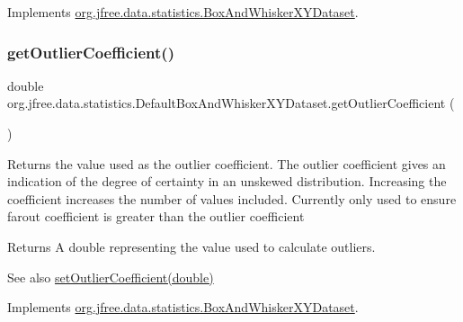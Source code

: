 Implements \mbox{\hyperlink{interfaceorg_1_1jfree_1_1data_1_1statistics_1_1_box_and_whisker_x_y_dataset_a11d53213d4eb15fd9691645b1b0edcb4}{org.\+jfree.\+data.\+statistics.\+Box\+And\+Whisker\+X\+Y\+Dataset}}.

\mbox{\label{classorg_1_1jfree_1_1data_1_1statistics_1_1_default_box_and_whisker_x_y_dataset_ac47213bfcf3d3a0069a096077ea77531}} 
\subsubsection{\texorpdfstring{get\+Outlier\+Coefficient()}{getOutlierCoefficient()}}
{\footnotesize\ttfamily double org.\+jfree.\+data.\+statistics.\+Default\+Box\+And\+Whisker\+X\+Y\+Dataset.\+get\+Outlier\+Coefficient (\begin{DoxyParamCaption}{ }\end{DoxyParamCaption})}

Returns the value used as the outlier coefficient. The outlier coefficient gives an indication of the degree of certainty in an unskewed distribution. Increasing the coefficient increases the number of values included. Currently only used to ensure farout coefficient is greater than the outlier coefficient

\begin{DoxyReturn}{Returns}
A {\ttfamily double} representing the value used to calculate outliers.
\end{DoxyReturn}
\begin{DoxySeeAlso}{See also}
\mbox{\hyperlink{classorg_1_1jfree_1_1data_1_1statistics_1_1_default_box_and_whisker_x_y_dataset_afa20bd58ffbcf073b4aadf19b08d52e1}{set\+Outlier\+Coefficient(double)}} 
\end{DoxySeeAlso}


Implements \mbox{\hyperlink{interfaceorg_1_1jfree_1_1data_1_1statistics_1_1_box_and_whisker_x_y_dataset_a3df6c697a6acb9897a6bd728db18d578}{org.\+jfree.\+data.\+statistics.\+Box\+And\+Whisker\+X\+Y\+Dataset}}.

